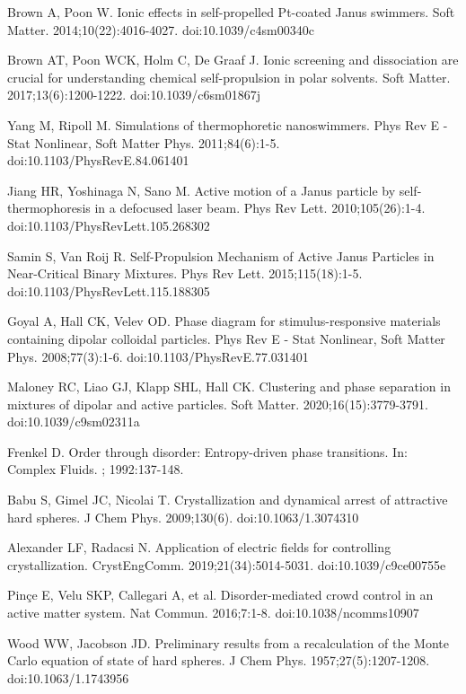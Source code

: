 \documentclass[11pt]{article}
\begin{document}
\begin{thebibliography}{9}
Brown A, Poon W. Ionic effects in self-propelled Pt-coated Janus swimmers. Soft Matter. 2014;10(22):4016-4027. doi:10.1039/c4sm00340c

Brown AT, Poon WCK, Holm C, De Graaf J. Ionic screening and dissociation are crucial for understanding chemical self-propulsion in polar solvents. Soft Matter. 2017;13(6):1200-1222. doi:10.1039/c6sm01867j

Yang M, Ripoll M. Simulations of thermophoretic nanoswimmers. Phys Rev E - Stat Nonlinear, Soft Matter Phys. 2011;84(6):1-5. doi:10.1103/PhysRevE.84.061401

Jiang HR, Yoshinaga N, Sano M. Active motion of a Janus particle by self-thermophoresis in a defocused laser beam. Phys Rev Lett. 2010;105(26):1-4. doi:10.1103/PhysRevLett.105.268302

Samin S, Van Roij R. Self-Propulsion Mechanism of Active Janus Particles in Near-Critical Binary Mixtures. Phys Rev Lett. 2015;115(18):1-5. doi:10.1103/PhysRevLett.115.188305

Goyal A, Hall CK, Velev OD. Phase diagram for stimulus-responsive materials containing dipolar colloidal particles. Phys Rev E - Stat Nonlinear, Soft Matter Phys. 2008;77(3):1-6. doi:10.1103/PhysRevE.77.031401

Maloney RC, Liao GJ, Klapp SHL, Hall CK. Clustering and phase separation in mixtures of dipolar and active particles. Soft Matter. 2020;16(15):3779-3791. doi:10.1039/c9sm02311a

Frenkel D. Order through disorder: Entropy-driven phase transitions. In: Complex Fluids. ; 1992:137-148.

Babu S, Gimel JC, Nicolai T. Crystallization and dynamical arrest of attractive hard spheres. J Chem Phys. 2009;130(6). doi:10.1063/1.3074310

Alexander LF, Radacsi N. Application of electric fields for controlling crystallization. CrystEngComm. 2019;21(34):5014-5031. doi:10.1039/c9ce00755e

Pinçe E, Velu SKP, Callegari A, et al. Disorder-mediated crowd control in an active matter system. Nat Commun. 2016;7:1-8. doi:10.1038/ncomms10907

Wood WW, Jacobson JD. Preliminary results from a recalculation of the Monte Carlo equation of state of hard spheres. J Chem Phys. 1957;27(5):1207-1208. doi:10.1063/1.1743956


\end{thebibliography}
\end{document}
